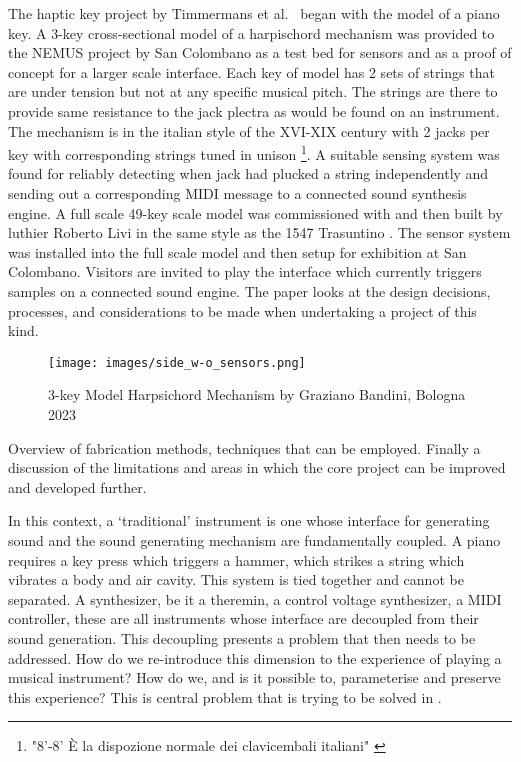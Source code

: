 The haptic key project by Timmermans et al.~\cite{Timmermans2020} began
with the model of a piano key. A 3-key cross-sectional model of a
harpischord mechanism  was provided to the NEMUS project by
San Colombano as a test bed for sensors and as a proof of concept for a
larger scale interface. Each key of model has 2 sets of strings that are
under tension but not at any specific musical pitch. The strings are
there to provide same resistance to the jack plectra as would be found
on an instrument. The mechanism is in the italian style of the XVI-XIX
century with 2 jacks per key with corresponding strings tuned in unison
\footnote{"8'-8' È la dispozione normale dei clavicembali
italiani" \cite{Tagliavini1987}}. A suitable sensing system was found
for reliably detecting when jack had plucked a string independently and
sending out a corresponding MIDI message to a connected sound synthesis
engine. A full scale 49-key scale model was commissioned with and then
built by luthier Roberto Livi in the same style as the 1547 Trasuntino
. The sensor system was installed into the full scale
model and then setup for exhibition at San Colombano. Visitors are
invited to play the interface which currently triggers samples on a
connected sound engine. The paper looks at the design decisions,
processes, and considerations to be made when undertaking a project of
this kind.

\begin{figure}
  \label{}
  \centering
  \texttt{[image: images/side\_w-o\_sensors.png]} 
  \caption{3-key Model Harpsichord Mechanism by Graziano Bandini, Bologna 2023}  
\label{fig:3key}
\end{figure}

Overview of fabrication methods, techniques that can be employed.
Finally a discussion of the limitations and areas in which the core
project can be improved and developed further.

In this context, a `traditional' instrument is one whose interface for
generating sound and the sound generating mechanism are fundamentally
coupled. A piano requires a key press which triggers a hammer, which
strikes a string which vibrates a body and air cavity. This system is
tied together and cannot be separated. A synthesizer, be it a theremin,
a control voltage synthesizer, a MIDI controller, these are all
instruments whose interface are decoupled from their sound generation.
This decoupling presents a problem that then needs to be addressed. How
do we re-introduce this dimension to the experience of playing a musical
instrument? How do we, and is it possible to, parameterise and preserve
this experience? This is central problem that is trying to be solved in
\cite{Nichols2002, Timmermans2020, McAlpine2014, Baldwin2016}.

